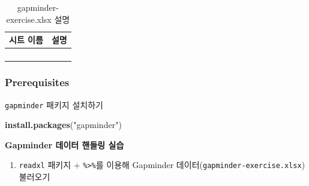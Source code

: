\documentclass[
  11pt,
]{krantz}
\makeatletter
\newenvironment{Shaded}{\begin{snugshade}}{\end{snugshade}}
\newcommand{\KeywordTok}[1]{\textcolor[rgb]{0.27,0.27,0.27}{\textbf{#1}}}
\newcommand{\NormalTok}[1]{#1}
\newcommand{\StringTok}[1]{\textcolor[rgb]{0.5,0.5,0.5}{#1}}
\providecommand{\tightlist}{%
  \setlength{\itemsep}{0pt}\setlength{\parskip}{0pt}}
\newenvironment{kframe}{%
\medskip{}
\setlength{\fboxsep}{.8em}
 \def\at@end@of@kframe{}%
 \ifinner\ifhmode%
  \def\at@end@of@kframe{\end{minipage}}%
  \begin{minipage}{\columnwidth}%
 \fi\fi%
 \def\FrameCommand##1{\hskip\@totalleftmargin \hskip-\fboxsep
 \colorbox{shadecolor}{##1}\hskip-\fboxsep
     \hskip-\linewidth \hskip-\@totalleftmargin \hskip\columnwidth}%
 \MakeFramed {\advance\hsize-\width
   \@totalleftmargin\z@ \linewidth\hsize
   \@setminipage}}%
 {\par\unskip\endMakeFramed%
 \at@end@of@kframe}
\renewenvironment{quote}{\begin{kframe}}{\end{kframe}}
\let\BeginKnitrBlock\begin \let\EndKnitrBlock\end
\makeatother
\begin{document}
\normalsize

\footnotesize

\begin{table}[H]

\caption{\label{tab:unnamed-chunk-62}gapminder-exercise.xlsx 설명}
\centering
\fontsize{11}{13}\selectfont
\begin{tabu} to 
\toprule
시트 이름 & 설명\\
\midrule
{}   & \\
 & \\
   & \\
 & \\
\bottomrule
\end{tabu}
\end{table}

\normalsize

\hypertarget{ex-pre}{%
\subsubsection*{Prerequisites}\label{ex-pre}}


\begin{quote}
\texttt{gapminder} 패키지 설치하기
\end{quote}

\footnotesize

\begin{Shaded}
\begin{Highlighting}[]
\KeywordTok{install.packages}\NormalTok{(}\StringTok{"gapminder"}\NormalTok{)}
\end{Highlighting}
\end{Shaded}

\normalsize

\footnotesize

\BeginKnitrBlock{rmdimportant}
\textbf{Gapminder 데이터 핸들링 실습}
\EndKnitrBlock{rmdimportant}

\normalsize

\begin{enumerate}
\def\labelenumi{\arabic{enumi}.}
\tightlist
\item
  \texttt{readxl} 패키지 + \texttt{\%\textgreater{}\%}를 이용해 Gapminder 데이터(\texttt{gapminder-exercise.xlsx}) 불러오기
\end{enumerate}
\end{document}
